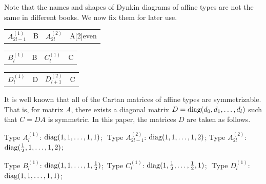 \documentclass[11pt]{amsart}
\theoremstyle{plain}
\numberwithin{equation}{subsection}
\begin{document}
\smallskip

Note that the names and shapes of Dynkin diagrams of affine types are not the same in different books. We now fix them for later use.

\smallskip

\begin{center}
	\begin{tabular}{lclc}
		${A}_{2l-1}^{(1)}$ & \dynkin [edge length=2.75em,extended,reverse arrows,labels={0,1,2,3,l-2,l-1,l}]B{}
		& $A_{2l}^{(2)}$ &\dynkin[edge length=2.75em,extended,labels={0,1,2,3,l-2,l-1,l}] A[2]{even}\\
\end{tabular}
\end{center}
\begin{center}
	\begin{tabular}{lclc}
		${B}_l^{(1)}$ & \dynkin [edge length=2.75em,extended,labels={0,1,2,3,l-2,l-1,l}]B{}
		& ${C}_l^{(1)}$ & \dynkin [edge length=2.75em,extended,labels={0,1,2,l-2,l-1,l}]C{}\\
\end{tabular}
\end{center}
\begin{center}
	\begin{tabular}{lclc}
		${D}_l^{(1)}$ & \dynkin [edge length=2.75em,extended,labels={0,1,2,3,l-3, l-2,l-1,l}]D{}
		& ${D}_{l+1}^{(2)}$ & \dynkin [edge length=2.75em,extended,reverse arrows,labels={0,1,2,l-2,l-1,l}]C{}\\
	\end{tabular}
\end{center}

\smallskip

It is well known that all of the Cartan matrices of affine types are symmetrizable. 
That is, for matrix $A$, there exists a diagonal matrix $D={\rm diag}(d_0, d_1, \dots, d_l)$ such that $C=DA$ is symmetric. 
In this paper, the matrices $D$ are taken as follows.

\smallskip

Type $A_{l}^{(1)}$: ${\rm diag}(1, 1, \dots , 1, 1)$; \,\,Type $A_{2l-1}^{(2)}$: ${\rm diag}(1, 1, \dots , 1, 2)$; 
Type $A_{2l}^{(2)}$: ${\rm diag}(\frac{1}{2}, 1, \dots , 1, 2)$;

\smallskip

Type $B_l^{(1)}$: ${\rm diag}(1, 1, \dots , 1, \frac{1}{2})$;\,
Type $C_l^{(1)}$: ${\rm diag}(1, \frac{1}{2}, \dots , \frac{1}{2}, 1)$;\,\, Type $D_l^{(1)}$: ${\rm diag}(1, 1, \dots , 1, 1)$;
\end{document}
